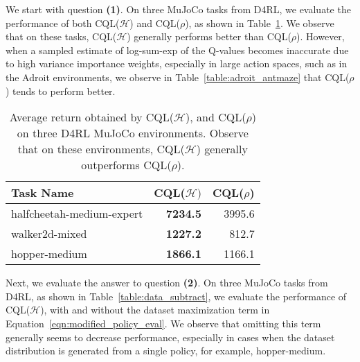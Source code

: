 We start with question \textbf{(1)}. On three MuJoCo tasks from D4RL, we evaluate the performance of both CQL($\mathcal{H}$) and CQL($\rho$), as shown in Table~\ref{table:mujoco_cql_ablation}. We observe that on these tasks, CQL($\mathcal{H}$) generally performs better than CQL($\rho$). However, when a sampled estimate of log-sum-exp of the Q-values becomes inaccurate due to high variance importance weights, especially in large action spaces, such as in the Adroit environments, we observe in Table~\ref{table:adroit_antmaze} that CQL($\rho$) tends to perform better.

\begin{table}[h]
    \centering
    \begin{tabular}{l|r|r}
    \hline
        \textbf{Task Name} & \textbf{CQL($\mathcal{H})$} & \textbf{CQL($\rho$)} \\
        \hline
        halfcheetah-medium-expert & \textbf{7234.5} & 3995.6 \\
        walker2d-mixed & \textbf{1227.2} & 812.7  \\
        hopper-medium & \textbf{1866.1} & 1166.1 \\
        \hline
    \end{tabular}
    \caption{{\small Average return obtained by CQL($\mathcal{H}$), and CQL($\rho$) on three D4RL MuJoCo environments. Observe that on these environments, CQL($\mathcal{H}$) generally outperforms CQL($\rho$).}}
    \label{table:mujoco_cql_ablation}
    \vspace{-15pt}
\end{table}

Next, we evaluate the answer to question \textbf{(2)}. On three MuJoCo tasks from D4RL, as shown in Table~\ref{table:data_subtract}, we evaluate the performance of CQL($\mathcal{H}$), with and without the dataset maximization term in Equation~\ref{eqn:modified_policy_eval}. We observe that omitting this term generally seems to decrease performance, especially in cases when the dataset distribution is generated from a single policy, for example, hopper-medium.


